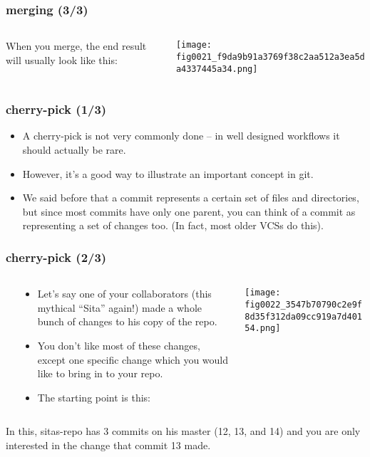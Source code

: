 \documentclass[presentation]{beamer}
\begin{document}
\begin{frame}
\frametitle{merging (3/3)}
\label{sec-8-4}
\begin{columns}
\begin{column}{0.4\textwidth}
\label{sec-8-4-1}


When you merge, the end result will usually look like this:
\end{column}
\begin{column}{0.6\textwidth}
\label{sec-8-4-2}



\texttt{[image: fig0021\_f9da9b91a3769f38c2aa512a3ea5da4337445a34.png]}
\end{column}
\end{columns}
\end{frame}
\begin{frame}
\frametitle{cherry-pick (1/3)}
\label{sec-8-5}


\begin{itemize}
\item A cherry-pick is not very commonly done -- in well designed workflows it
  should actually be rare.
\item However, it's a good way to illustrate an important
  concept in git.
\item We said before that a commit represents a certain set of files and
  directories, but since most commits have only one parent, you can think of a
  commit as representing a set of changes too.  (In fact, most older VCSs do
  this).
\end{itemize}
\end{frame}
\begin{frame}
\frametitle{cherry-pick (2/3)}
\label{sec-8-6}
\begin{columns} %
\label{sec-8-6-1}
\begin{column}{0.5\textwidth}
\label{sec-8-6-1-1}



\begin{itemize}
\item Let's say one of your collaborators (this mythical ``Sita'' again!) made a whole
  bunch of changes to his copy of the repo.
\item You don't like most of these
  changes, except one specific change which you would like to bring in to your
  repo.
\item The starting point is this:
\end{itemize}
\end{column}
\begin{column}{0.5\textwidth}
\label{sec-8-6-1-2}


\texttt{[image: fig0022\_3547b70790c2e9f8d35f312da09cc919a7d40154.png]}
\end{column}
\end{columns}
\label{sec-8-6-2}


\small
In this, sitas-repo has 3 commits on his master (12, 13, and 14) and you are
only interested in the change that commit 13 made.
\end{frame}
\end{document}

